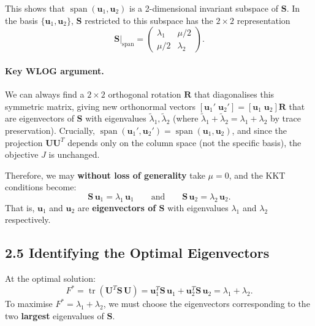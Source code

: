 \documentclass[11pt]{article}
\begin{document}
This shows that $\operatorname{span}(\boldsymbol{u}_1,\boldsymbol{u}_2)$ is a 2-dimensional
invariant subspace of $\boldsymbol{S}$. In the basis $\{\boldsymbol{u}_1,\boldsymbol{u}_2\}$,
$\boldsymbol{S}$ restricted to this subspace has the $2\times 2$ representation
\[
\boldsymbol{S}\big|_{\operatorname{span}} =
\begin{pmatrix}\lambda_1 & \mu/2 \\ \mu/2 & \lambda_2\end{pmatrix}.
\]

\paragraph{Key WLOG argument.}
We can always find a $2\times 2$ orthogonal rotation $\boldsymbol{R}$ that diagonalises
this symmetric matrix, giving new orthonormal vectors
$[\boldsymbol{u}_1'\;\boldsymbol{u}_2'] = [\boldsymbol{u}_1\;\boldsymbol{u}_2]\boldsymbol{R}$
that are eigenvectors of $\boldsymbol{S}$ with eigenvalues $\tilde\lambda_1, \tilde\lambda_2$
(where $\tilde\lambda_1 + \tilde\lambda_2 = \lambda_1 + \lambda_2$ by trace preservation).
Crucially,
$\operatorname{span}(\boldsymbol{u}_1',\boldsymbol{u}_2') = \operatorname{span}(\boldsymbol{u}_1,\boldsymbol{u}_2)$,
and since the projection $\boldsymbol{U}\boldsymbol{U}^T$ depends only on the column space
(not the specific basis), the objective $J$ is unchanged.

Therefore, we may \textbf{without loss of generality} take $\mu = 0$, and the KKT conditions become:
\[
\boxed{\boldsymbol{S}\,\boldsymbol{u}_1 = \lambda_1\,\boldsymbol{u}_1
\qquad\text{and}\qquad
\boldsymbol{S}\,\boldsymbol{u}_2 = \lambda_2\,\boldsymbol{u}_2.}
\]
That is, $\boldsymbol{u}_1$ and $\boldsymbol{u}_2$ are \textbf{eigenvectors of $\boldsymbol{S}$}
with eigenvalues $\lambda_1$ and $\lambda_2$ respectively.

\subsection*{2.5 Identifying the Optimal Eigenvectors}

At the optimal solution:
\[
F^* = \operatorname{tr}(\boldsymbol{U}^T\boldsymbol{S}\,\boldsymbol{U})
= \boldsymbol{u}_1^T\boldsymbol{S}\,\boldsymbol{u}_1 + \boldsymbol{u}_2^T\boldsymbol{S}\,\boldsymbol{u}_2
= \lambda_1 + \lambda_2.
\]
To maximise $F^* = \lambda_1 + \lambda_2$, we must choose the eigenvectors corresponding
to the two \textbf{largest} eigenvalues of $\boldsymbol{S}$.
\end{document}
